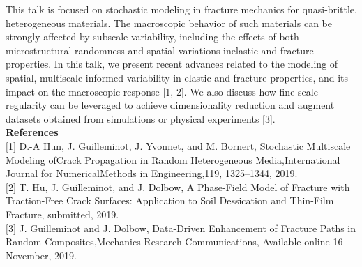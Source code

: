 This talk is focused on stochastic modeling in fracture mechanics for quasi-brittle, heterogeneous materials. The macroscopic behavior of such materials can be strongly affected by subscale variability, including the effects of both microstructural randomness and spatial variations inelastic and fracture properties. In this talk, we present recent advances related to the modeling of spatial, multiscale-informed variability in elastic and fracture properties, and its impact on the macroscopic response [1, 2]. We also discuss how fine scale regularity can be leveraged to achieve dimensionality reduction and augment datasets obtained from simulations or physical experiments [3].\\

\noindent\textbf{References}\\
$[$1$]$ D.-A Hun, J. Guilleminot, J. Yvonnet, and M. Bornert, Stochastic Multiscale Modeling ofCrack Propagation in Random Heterogeneous Media,International Journal for NumericalMethods in Engineering,119, 1325–1344, 2019. \\\newline
$[$2$]$ T. Hu, J. Guilleminot, and J. Dolbow, A Phase-Field Model of Fracture with Traction-Free Crack Surfaces: Application to Soil Dessication and Thin-Film Fracture, submitted, 2019. \\\newline
$[$3$]$ J. Guilleminot and J. Dolbow, Data-Driven Enhancement of Fracture Paths in Random Composites,Mechanics Research Communications, Available online 16 November, 2019.
